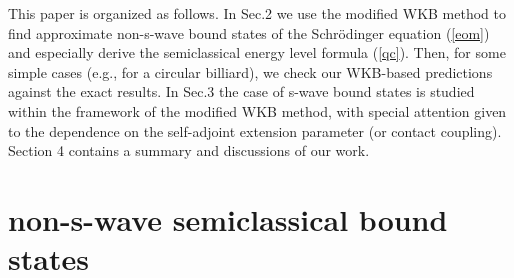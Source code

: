 \documentclass[a4paper,aps,eqsecnum,preprint,preprintnumbers,12pt]{revtex4}
\begin{document}
This paper is organized as follows. In Sec.2 we use the modified
WKB method to find approximate non-s-wave bound states of the
Schr\"{o}dinger equation (\ref{eom}) and especially derive the
semiclassical energy level formula (\ref{qc}). Then, for some
simple cases (e.g., for a circular billiard), we check our
WKB-based predictions against the exact results. In Sec.3 the case
of s-wave bound states is studied within the framework of the
modified WKB method, with special attention given to the
dependence on the self-adjoint extension parameter (or contact
coupling). Section 4 contains a summary and discussions of our
work.

\section{non-s-wave semiclassical bound states}
\end{document}

